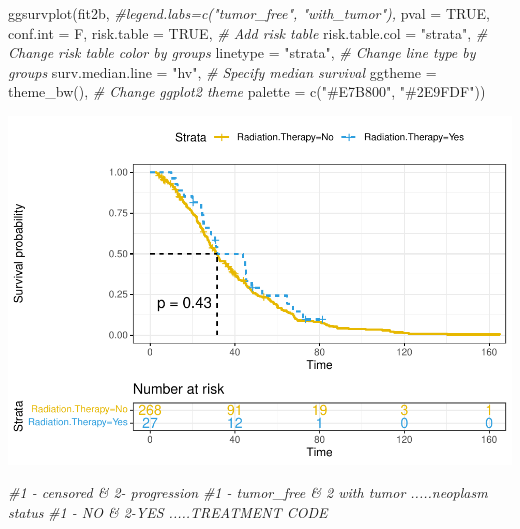 \documentclass[
  11pt,
]{article}
\newenvironment{Shaded}{\begin{snugshade}}{\end{snugshade}}
\newcommand{\AttributeTok}[1]{\textcolor[rgb]{0.77,0.63,0.00}{#1}}
\newcommand{\CommentTok}[1]{\textcolor[rgb]{0.56,0.35,0.01}{\textit{#1}}}
\newcommand{\ConstantTok}[1]{\textcolor[rgb]{0.00,0.00,0.00}{#1}}
\newcommand{\FunctionTok}[1]{\textcolor[rgb]{0.00,0.00,0.00}{#1}}
\newcommand{\NormalTok}[1]{#1}
\newcommand{\StringTok}[1]{\textcolor[rgb]{0.31,0.60,0.02}{#1}}
\begin{document}
\begin{Shaded}
\begin{Highlighting}[]
\FunctionTok{ggsurvplot}\NormalTok{(fit2b,}
          \CommentTok{\#legend.labs=c("tumor\_free", "with\_tumor"),}
          \AttributeTok{pval =} \ConstantTok{TRUE}\NormalTok{, }\AttributeTok{conf.int =}\NormalTok{ F,}
          \AttributeTok{risk.table =} \ConstantTok{TRUE}\NormalTok{, }\CommentTok{\# Add risk table}
          \AttributeTok{risk.table.col =} \StringTok{"strata"}\NormalTok{, }\CommentTok{\# Change risk table color by groups}
          \AttributeTok{linetype =} \StringTok{"strata"}\NormalTok{, }\CommentTok{\# Change line type by groups}
          \AttributeTok{surv.median.line =} \StringTok{"hv"}\NormalTok{, }\CommentTok{\# Specify median survival}
          \AttributeTok{ggtheme =} \FunctionTok{theme\_bw}\NormalTok{(), }\CommentTok{\# Change ggplot2 theme}
          \AttributeTok{palette =} \FunctionTok{c}\NormalTok{(}\StringTok{"\#E7B800"}\NormalTok{, }\StringTok{"\#2E9FDF"}\NormalTok{))}
\end{Highlighting}
\end{Shaded}

\includegraphics{new_surv_3_files/figure-latex/unnamed-chunk-8-1.pdf}

\begin{Shaded}
\begin{Highlighting}[]
\CommentTok{\#1 {-} censored \& 2{-} progression}
\CommentTok{\#1 {-} tumor\_free \& 2 with tumor .....neoplasm status }
\CommentTok{\#1 {-} NO \& 2{-}YES .....TREATMENT CODE}
\end{Highlighting}
\end{Shaded}
\end{document}
